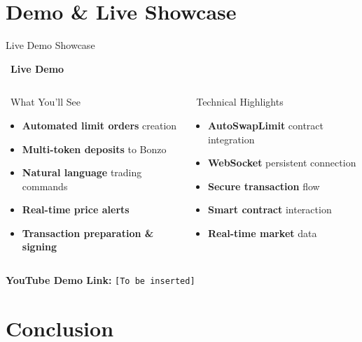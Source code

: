 \documentclass[aspectratio=169]{beamer}
\begin{document}
\section{Demo \& Live Showcase}

\begin{frame}{Live Demo Showcase}
\begin{center}
\large \faPlay\ \textbf{Live Demo}
\end{center}

\vspace{0.05cm}

\begin{columns}
\begin{block}{\faDesktop\ What You'll See}
\begin{itemize}
\item \textbf{Automated limit orders} creation
\item \textbf{Multi-token deposits} to Bonzo
\item \textbf{Natural language} trading commands
\item \textbf{Real-time price alerts}
\item \textbf{Transaction preparation \& signing}
\end{itemize}
\end{block}

\begin{block}{\faCode\ Technical Highlights}
\begin{itemize}
\item \textbf{AutoSwapLimit} contract integration
\item \textbf{WebSocket} persistent connection
\item \textbf{Secure transaction} flow
\item \textbf{Smart contract} interaction
\item \textbf{Real-time market} data
\end{itemize}
\end{block}
\end{columns}

\vspace{0.05cm}
\begin{center}
\footnotesize \textbf{YouTube Demo Link:} \texttt{[To be inserted]}
\end{center}
\end{frame}

\section{Conclusion}
\end{document}
